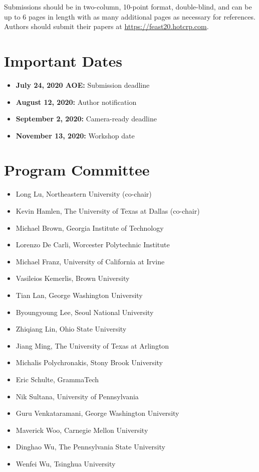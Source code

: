 \documentclass[10pt,letterpaper]{article}
\begin{document}
Submissions should be in two-column, 10-point format, double-blind, and can be up to 6 pages in length with as many additional pages as necessary for references.
Authors should submit their papers at
\url{https://feast20.hotcrp.com}.

\section*{Important Dates}

{\large
\begin{itemize}
\item \textbf{July  24, 2020 AOE:} Submission deadline
\item \textbf{August 12, 2020:} Author notification
\item \textbf{September 2, 2020:} Camera-ready deadline
\item \textbf{November 13, 2020:} Workshop date
\end{itemize}
}

\section*{Program Committee}

\begin{itemize}
\item Long Lu, Northeastern University (co-chair)
\item Kevin Hamlen, The University of Texas at Dallas (co-chair)

\item Michael Brown, Georgia Institute of Technology
\item Lorenzo De Carli, Worcester Polytechnic Institute
\item Michael Franz, University of California at Irvine
\item Vasileios Kemerlis, Brown University
\item Tian Lan, George Washington University
\item Byoungyoung Lee, Seoul National University
\item Zhiqiang Lin, Ohio State University
\item Jiang Ming, The University of Texas at Arlington
\item Michalis Polychronakis, Stony Brook University
\item Eric Schulte, GrammaTech
\item Nik Sultana, University of Pennsylvania
\item Guru Venkataramani, George Washington University
\item Maverick Woo, Carnegie Mellon University
\item Dinghao Wu, The Pennsylvania State University
\item Wenfei Wu, Tsinghua University
\end{itemize}
\end{document}
